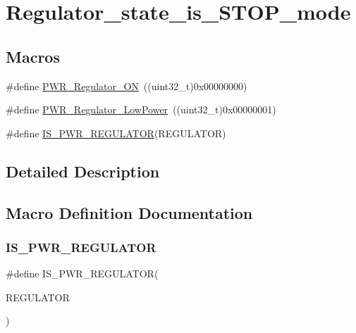 \hypertarget{group___regulator__state__is___s_t_o_p__mode}{}\section{Regulator\+\_\+state\+\_\+is\+\_\+\+S\+T\+O\+P\+\_\+mode}
\label{group___regulator__state__is___s_t_o_p__mode}
\subsection*{Macros}
\begin{DoxyCompactItemize}
\item 
\#define \mbox{\hyperlink{group___regulator__state__is___s_t_o_p__mode_gabf58b999bff6b4bf0fb5b97d74a75683}{P\+W\+R\+\_\+\+Regulator\+\_\+\+ON}}~((uint32\+\_\+t)0x00000000)
\item 
\#define \mbox{\hyperlink{group___regulator__state__is___s_t_o_p__mode_ga13745136d094661358d373b67ebf1ac7}{P\+W\+R\+\_\+\+Regulator\+\_\+\+Low\+Power}}~((uint32\+\_\+t)0x00000001)
\item 
\#define \mbox{\hyperlink{group___regulator__state__is___s_t_o_p__mode_ga03c105070272141c0bab5f2b74469072}{I\+S\+\_\+\+P\+W\+R\+\_\+\+R\+E\+G\+U\+L\+A\+T\+OR}}(R\+E\+G\+U\+L\+A\+T\+OR)
\end{DoxyCompactItemize}


\subsection{Detailed Description}


\subsection{Macro Definition Documentation}
\mbox{\label{group___regulator__state__is___s_t_o_p__mode_ga03c105070272141c0bab5f2b74469072}} 
\subsubsection{\texorpdfstring{IS\_PWR\_REGULATOR}{IS\_PWR\_REGULATOR}}
{\footnotesize\ttfamily \#define I\+S\+\_\+\+P\+W\+R\+\_\+\+R\+E\+G\+U\+L\+A\+T\+OR(\begin{DoxyParamCaption}\item[{}]{R\+E\+G\+U\+L\+A\+T\+OR }\end{DoxyParamCaption})}

